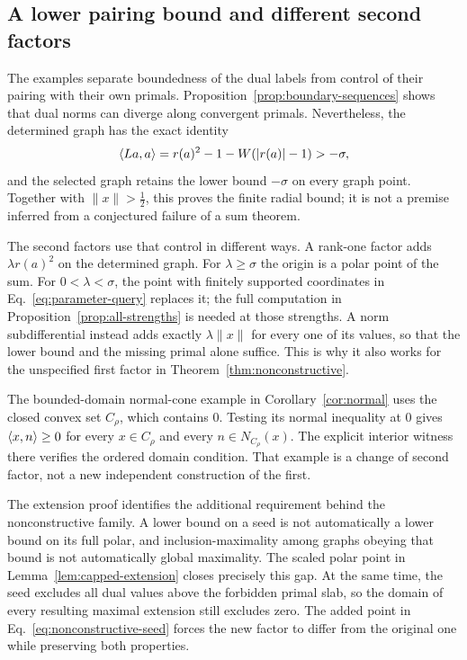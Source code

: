\subsection{A lower pairing bound and different second factors}
The examples separate boundedness of the dual labels from control of
their pairing with their own primals. Proposition~\ref{prop:boundary-sequences}
shows that dual norms can diverge along convergent primals. Nevertheless,
the determined graph has the exact identity
\[
\langle La,a\rangle=r(a)^2-1-W(|r(a)|-1)>-\sigma,
\]
and the selected graph retains the lower bound $-\sigma$ on every graph point.
Together with $\|x\|>\frac{1}{2}$, this proves the finite radial bound; it is
not a premise inferred from a conjectured failure of a sum theorem.

The second factors use that control in different ways. A rank-one factor
adds $\lambda r(a)^2$ on the determined graph. For $\lambda\ge\sigma$
the origin is a polar point of the sum. For $0<\lambda<\sigma$, the
point with finitely supported coordinates in Eq.~\eqref{eq:parameter-query} replaces it;
the full computation in Proposition~\ref{prop:all-strengths} is needed
at those strengths. A norm subdifferential instead adds exactly
$\lambda\|x\|$ for every one of its values, so that the lower bound
and the missing primal alone suffice. This is why it also works for
the unspecified first factor in Theorem~\ref{thm:nonconstructive}.

The bounded-domain normal-cone example in Corollary~\ref{cor:normal}
uses the closed convex set $C_\rho$, which contains $0$. Testing its
normal inequality at $0$ gives $\langle x,n\rangle\ge0$ for every
$x\in C_\rho$ and every $n\in N_{C_\rho}(x)$. The explicit interior
witness there verifies the ordered domain condition. That example is a change
of second factor, not a new independent construction of the first.


The extension proof identifies the additional requirement behind the
nonconstructive family. A lower bound on a seed is not automatically a
lower bound on its full polar, and inclusion-maximality among graphs
obeying that bound is not automatically global maximality. The scaled
polar point in Lemma~\ref{lem:capped-extension} closes precisely this
gap. At the same time, the seed excludes all dual values above the
forbidden primal slab, so the domain of every resulting maximal extension
still excludes zero. The added point in Eq.~\eqref{eq:nonconstructive-seed} forces the
new factor to differ from the original one while preserving both
properties.


